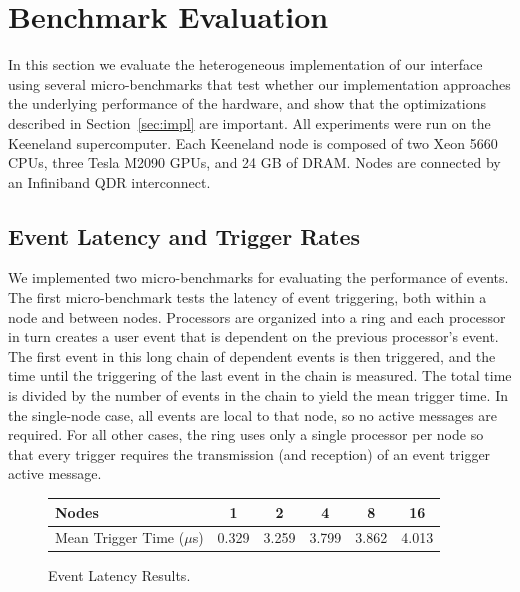 
\section{Benchmark Evaluation}
\label{sec:micro}

In this section we evaluate the heterogeneous implementation of our 
interface using several micro-benchmarks that test whether our implementation
approaches the underlying performance of the
hardware, and show that the optimizations described in Section~\ref{sec:impl}
are important.  All experiments were run on the Keeneland
supercomputer\cite{Keeneland}.  Each Keeneland node is composed of
two Xeon 5660 CPUs, three Tesla M2090 GPUs, and 24 GB of DRAM.  Nodes
are connected by an Infiniband QDR interconnect.

\subsection{Event Latency and Trigger Rates}
\label{subsec:eventmicro}
We implemented two micro-benchmarks for evaluating the performance of
events.  The first micro-benchmark tests the latency of event triggering,
both within a node and between nodes.  Processors are organized
into a ring and each processor in turn creates a user event that is dependent
on the previous processor's event.  The first event in this long chain of
dependent events is then triggered, and the time until the triggering of the
last event in the chain is measured.  The total time is divided by the number
of events in the chain to yield the mean trigger time.  In the single-node case, all events are local to
that node, so no active messages are required.  For all other cases, the
ring uses only a single processor per node so that every trigger requires
the transmission (and reception) of an event trigger active message.


\begin{figure}
\begin{center}
{ \small
\begin{tabular}{m{2cm}|c|c|c|c|c}
Nodes & 1 & 2 & 4 & 8 & 16 \\ \hline
Mean Trigger Time ($\mu$s) & 0.329 & 3.259 & 3.799 & 3.862 & 4.013 \\
\end{tabular}
}
\end{center}
\vspace{-6mm}
\caption{Event Latency Results.\label{tab:eventlat}}
\vspace{-4mm}
\end{figure}

